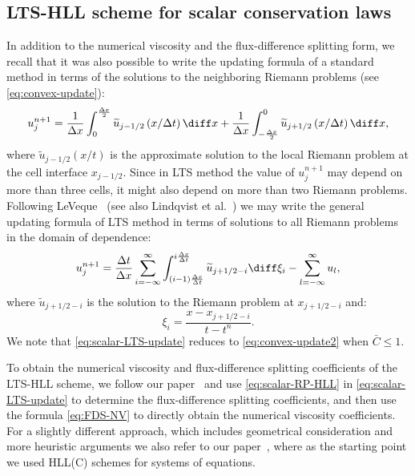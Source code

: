 \subsection{LTS-HLL scheme for scalar conservation laws}

In addition to the numerical viscosity and the flux-difference splitting form, we recall that it was also possible to write the updating formula of a standard method in terms of the solutions to the neighboring Riemann problems (see \eqref{eq:convex-update}):
\begin{equation} \label{eq:convex-update2}
u_j^{n+1} =
\frac{1}{\Delta x}
\int_{0}^{\frac{\Delta x}{2}} \widetilde{u}_{j-1/2} \left( x/ \Delta t \right) \diff x +
\frac{1}{\Delta x}
\int_{-\frac{\Delta x}{2}}^{0} \widetilde{u}_{j+1/2} \left( x/ \Delta t \right) \diff x,
\end{equation}
where $ \widetilde{u}_{j-1/2}(x/t) $ is the approximate solution to the local Riemann problem at the cell interface $ x_{j-1/2} $. Since in LTS method the value of $ u_j^{n+1} $ may depend on more than three cells, it might also depend on more than two Riemann problems. Following LeVeque~\cite{lev85} (see also Lindqvist et al.~\cite{lin16}) we may write the general updating formula of LTS method in terms of solutions to all Riemann problems in the domain of dependence:
\begin{equation} \label{eq:scalar-LTS-update}
u_j^{n+1} = \frac{\Delta t}{\Delta x} \sum\limits_{i=-\infty}^{\infty} \int_{(i-1)\frac{\Delta x}{\Delta t}}^{i \frac{\Delta x}{\Delta t}} \widetilde{u}_{j+1/2-i} \diff \xi_i - \sum\limits_{l=-\infty}^{\infty} u_l,
\end{equation}
where $ \widetilde{u}_{j+1/2-i} $ is the solution to the Riemann problem at $ x_{j+1/2-i} $ and:
\begin{equation}
\xi_i = \frac{x - x_{j+1/2-i}}{t - t^n}.
\end{equation}
We note that \eqref{eq:scalar-LTS-update} reduces to \eqref{eq:convex-update2} when $ \bar{C} \leq 1 $.

To obtain the numerical viscosity and flux-difference splitting coefficients of the LTS-HLL scheme, we follow our paper~\cite{jp2} and use \eqref{eq:scalar-RP-HLL} in \eqref{eq:scalar-LTS-update} to determine the flux-difference splitting coefficients, and then use the formula \eqref{eq:FDS-NV} to directly obtain the numerical viscosity coefficients. For a slightly different approach, which includes geometrical consideration and more heuristic arguments we also refer to our paper~\cite{jp2}, where as the starting point we used HLL(C) schemes for systems of equations.

